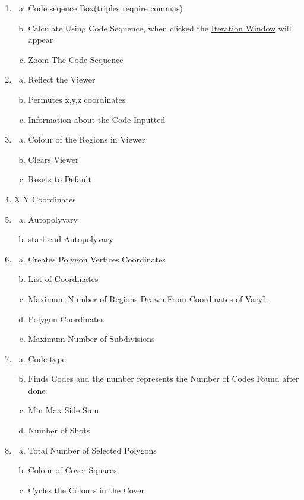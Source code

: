 \documentclass[11pt]{report}
\begin{document}
\begin{enumerate}
  \item
  \begin{enumerate}[a.]
    \item Code seqence Box(triples require commas)
    \item Calculate Using Code Sequence, when clicked the \hyperref[iterwin]{Iteration Window} will appear 
    \item Zoom The Code Sequence
  \end{enumerate}
  \item 
  \begin{enumerate}[a.]
    \item Reflect the Viewer
    \item Permutes x,y,z coordinates
    \item Information about the Code Inputted
  \end{enumerate}
  \item 
  \begin{enumerate}[a.]
    \item Colour of the Regions in Viewer
    \item Clears Viewer
    \item Resets to Default
  \end{enumerate}
  \item  X Y Coordinates 
  \item 
  \begin{enumerate}[a.]
    \item Autopolyvary
    \item start end Autopolyvary
  \end{enumerate}
  \item 
  \begin{enumerate}[a.]
    \item Creates Polygon Vertices Coordinates 
    \item List of Coordinates
    \item Maximum Number of Regions Drawn From Coordinates of VaryL
    \item Polygon Coordinates
    \item Maximum Number of Subdivisions
  \end{enumerate}
  \item 
  \begin{enumerate}[a.]
    \item Code type
    \item Finds Codes and the number represents the Number of Codes Found after done
    \item Min Max Side Sum 
    \item Number of Shots
  \end{enumerate}
  \item 
  \begin{enumerate}[a.]
    \item  Total Number of Selected Polygons
    \item Colour of Cover Squares
    \item Cycles the Colours in the Cover


\end{enumerate}
\end{enumerate}
\end{document}
